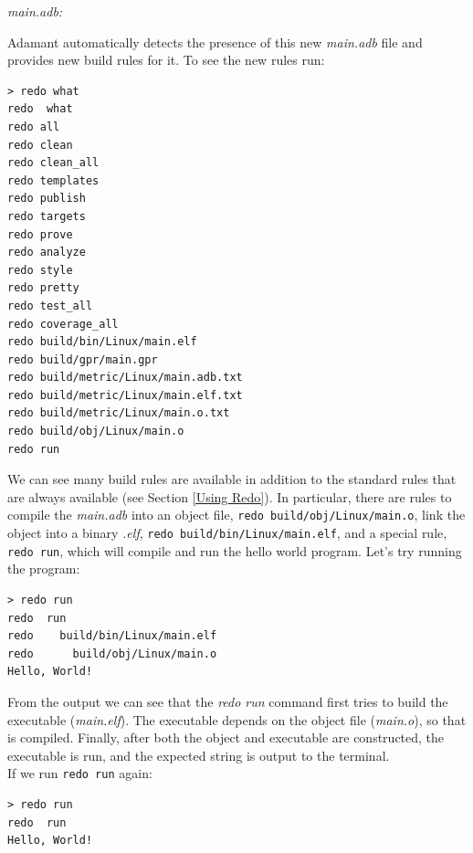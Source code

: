 \textit{main.adb:}

Adamant automatically detects the presence of this new \textit{main.adb} file and provides new build rules for it. To see the new rules run:

\vspace{5mm} %
\begin{verbatim}
> redo what
redo  what
redo all
redo clean
redo clean_all
redo templates
redo publish
redo targets
redo prove
redo analyze
redo style
redo pretty
redo test_all
redo coverage_all
redo build/bin/Linux/main.elf
redo build/gpr/main.gpr
redo build/metric/Linux/main.adb.txt
redo build/metric/Linux/main.elf.txt
redo build/metric/Linux/main.o.txt
redo build/obj/Linux/main.o
redo run
\end{verbatim}
\vspace{5mm} %

We can see many build rules are available in addition to the standard rules that are always available (see Section \ref{Using Redo}). In particular, there are rules to compile the \textit{main.adb} into an object file, \texttt{redo build/obj/Linux/main.o}, link the object into a binary \textit{.elf}, \texttt{redo build/bin/Linux/main.elf}, and a special rule, \texttt{redo run}, which will compile and run the hello world program. Let's try running the program:

\vspace{5mm} %
\begin{verbatim}
> redo run
redo  run
redo    build/bin/Linux/main.elf
redo      build/obj/Linux/main.o
Hello, World!
\end{verbatim}
\vspace{5mm} %

From the output we can see that the \textit{redo run} command first tries to build the executable (\textit{main.elf}). The executable depends on the object file (\textit{main.o}), so that is compiled. Finally, after both the object and executable are constructed, the executable is run, and the expected string is output to the terminal. \\

If we run \texttt{redo run} again:

\vspace{5mm} %
\begin{verbatim}
> redo run
redo  run
Hello, World!
\end{verbatim}
\vspace{5mm} %


